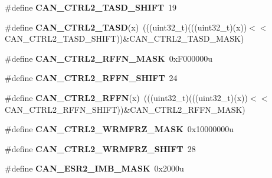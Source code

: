 \begin{DoxyCompactItemize}
\item 
\#define {\bfseries C\+A\+N\+\_\+\+C\+T\+R\+L2\+\_\+\+T\+A\+S\+D\+\_\+\+S\+H\+I\+FT}~19\hypertarget{group__CAN__Register__Masks_gac9265ea7ee9b07803fdb62c92aa85ea0}{}\label{group__CAN__Register__Masks_gac9265ea7ee9b07803fdb62c92aa85ea0}

\item 
\#define {\bfseries C\+A\+N\+\_\+\+C\+T\+R\+L2\+\_\+\+T\+A\+SD}(x)~(((uint32\+\_\+t)(((uint32\+\_\+t)(x))$<$$<$C\+A\+N\+\_\+\+C\+T\+R\+L2\+\_\+\+T\+A\+S\+D\+\_\+\+S\+H\+I\+FT))\&C\+A\+N\+\_\+\+C\+T\+R\+L2\+\_\+\+T\+A\+S\+D\+\_\+\+M\+A\+SK)\hypertarget{group__CAN__Register__Masks_gaf3ad35b3f0ed4a3a4fea9d9fff938109}{}\label{group__CAN__Register__Masks_gaf3ad35b3f0ed4a3a4fea9d9fff938109}

\item 
\#define {\bfseries C\+A\+N\+\_\+\+C\+T\+R\+L2\+\_\+\+R\+F\+F\+N\+\_\+\+M\+A\+SK}~0x\+F000000u\hypertarget{group__CAN__Register__Masks_ga2cf8e472f27dccf6b1e9b9af80f76542}{}\label{group__CAN__Register__Masks_ga2cf8e472f27dccf6b1e9b9af80f76542}

\item 
\#define {\bfseries C\+A\+N\+\_\+\+C\+T\+R\+L2\+\_\+\+R\+F\+F\+N\+\_\+\+S\+H\+I\+FT}~24\hypertarget{group__CAN__Register__Masks_ga573803e007b6904ec3b8c5ab45acf33e}{}\label{group__CAN__Register__Masks_ga573803e007b6904ec3b8c5ab45acf33e}

\item 
\#define {\bfseries C\+A\+N\+\_\+\+C\+T\+R\+L2\+\_\+\+R\+F\+FN}(x)~(((uint32\+\_\+t)(((uint32\+\_\+t)(x))$<$$<$C\+A\+N\+\_\+\+C\+T\+R\+L2\+\_\+\+R\+F\+F\+N\+\_\+\+S\+H\+I\+FT))\&C\+A\+N\+\_\+\+C\+T\+R\+L2\+\_\+\+R\+F\+F\+N\+\_\+\+M\+A\+SK)\hypertarget{group__CAN__Register__Masks_ga74a275be00e2474d0621b2f09968440c}{}\label{group__CAN__Register__Masks_ga74a275be00e2474d0621b2f09968440c}

\item 
\#define {\bfseries C\+A\+N\+\_\+\+C\+T\+R\+L2\+\_\+\+W\+R\+M\+F\+R\+Z\+\_\+\+M\+A\+SK}~0x10000000u\hypertarget{group__CAN__Register__Masks_ga5f73e5da9fb12e711d2b23b7092788f2}{}\label{group__CAN__Register__Masks_ga5f73e5da9fb12e711d2b23b7092788f2}

\item 
\#define {\bfseries C\+A\+N\+\_\+\+C\+T\+R\+L2\+\_\+\+W\+R\+M\+F\+R\+Z\+\_\+\+S\+H\+I\+FT}~28\hypertarget{group__CAN__Register__Masks_ga1ada3c4c31b40ac2d1d0aa69b8beead7}{}\label{group__CAN__Register__Masks_ga1ada3c4c31b40ac2d1d0aa69b8beead7}

\item 
\#define {\bfseries C\+A\+N\+\_\+\+E\+S\+R2\+\_\+\+I\+M\+B\+\_\+\+M\+A\+SK}~0x2000u\hypertarget{group__CAN__Register__Masks_ga8e8d269c3e59c20582dd8d0c5ea07daf}{}\label{group__CAN__Register__Masks_ga8e8d269c3e59c20582dd8d0c5ea07daf}


\end{DoxyCompactItemize}
